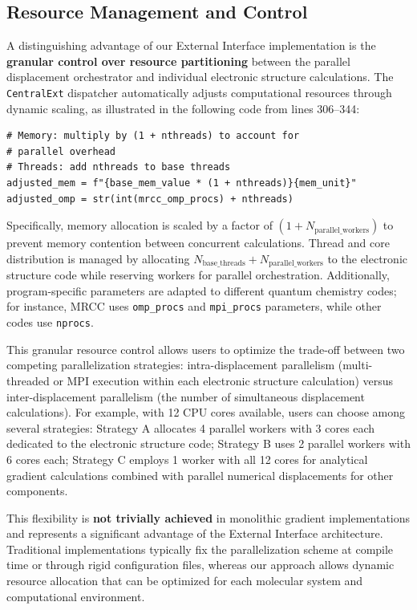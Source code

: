 \documentclass[11pt]{article}
\begin{document}
\subsection{Resource Management and Control}

A distinguishing advantage of our External Interface implementation is the \textbf{granular control over resource partitioning} between the parallel displacement orchestrator and individual electronic structure calculations. The \texttt{CentralExt} dispatcher automatically adjusts computational resources through dynamic scaling, as illustrated in the following code from lines 306--344:

\begin{lstlisting}
# Memory: multiply by (1 + nthreads) to account for
# parallel overhead
# Threads: add nthreads to base threads
adjusted_mem = f"{base_mem_value * (1 + nthreads)}{mem_unit}"
adjusted_omp = str(int(mrcc_omp_procs) + nthreads)
\end{lstlisting}

Specifically, memory allocation is scaled by a factor of $(1 + N_{\text{parallel\_workers}})$ to prevent memory contention between concurrent calculations. Thread and core distribution is managed by allocating $N_{\text{base\_threads}} + N_{\text{parallel\_workers}}$ to the electronic structure code while reserving workers for parallel orchestration. Additionally, program-specific parameters are adapted to different quantum chemistry codes; for instance, MRCC uses \texttt{omp\_procs} and \texttt{mpi\_procs} parameters, while other codes use \texttt{nprocs}.

This granular resource control allows users to optimize the trade-off between two competing parallelization strategies: intra-displacement parallelism (multi-threaded or MPI execution within each electronic structure calculation) versus inter-displacement parallelism (the number of simultaneous displacement calculations). For example, with 12 CPU cores available, users can choose among several strategies: Strategy A allocates 4 parallel workers with 3 cores each dedicated to the electronic structure code; Strategy B uses 2 parallel workers with 6 cores each; Strategy C employs 1 worker with all 12 cores for analytical gradient calculations combined with parallel numerical displacements for other components.

This flexibility is \textbf{not trivially achieved} in monolithic gradient implementations and represents a significant advantage of the External Interface architecture. Traditional implementations typically fix the parallelization scheme at compile time or through rigid configuration files, whereas our approach allows dynamic resource allocation that can be optimized for each molecular system and computational environment.
\end{document}
